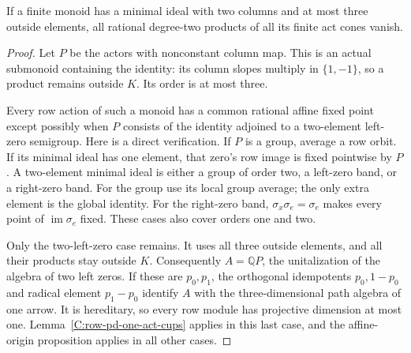 \begin{lemma}
\label{C:three-outside-all-two-column-act-cups}
If a finite monoid has a minimal ideal with two columns and
at most three outside elements, all rational degree-two
products of all its finite act cones vanish.
\end{lemma}
\begin{proof}
Let $P$ be the actors with nonconstant column map.  This is an
actual submonoid containing the identity: its column slopes
multiply in $\{1,-1\}$, so a product remains outside $K$.
Its order is at most three.

Every row action of such a monoid has a common rational affine
fixed point except possibly when $P$ consists of the identity
adjoined to a two-element left-zero semigroup.  Here is a direct
verification.  If $P$ is a group, average a row orbit.  If its
minimal ideal has one element, that zero's row image is fixed
pointwise by $P$.  A two-element minimal ideal is either a
group of order two, a left-zero band, or a right-zero band.
For the group use its local group average; the only extra
element is the global identity.  For the right-zero band,
$\sigma_x\sigma_e=\sigma_e$ makes every point of
$\operatorname{im}\sigma_e$ fixed.  These cases also cover
orders one and two.

Only the two-left-zero case remains.  It uses all three
outside elements, and all their products stay outside $K$.
Consequently $A=\mathbb QP$, the unitalization of the algebra
of two left zeros.  If these are $p_0,p_1$, the orthogonal
idempotents $p_0,1-p_0$ and radical element $p_1-p_0$ identify
$A$ with the three-dimensional path algebra of one arrow.
It is hereditary, so every row module has projective dimension
at most one.  Lemma~\ref{C:row-pd-one-act-cups} applies in
this last case, and the affine-origin proposition applies in
all other cases.
\end{proof}
